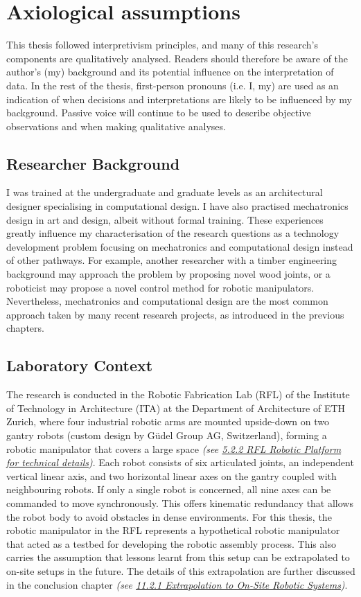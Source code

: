 \documentclass[11pt]{book}
\begin{document}
\section{Axiological assumptions}

This thesis followed interpretivism principles, and many of this research's components are qualitatively analysed. Readers should therefore be aware of the author’s (my) background and its potential influence on the interpretation of data. In the rest of the thesis, first-person pronouns (i.e. I, my) are used as an indication of when decisions and interpretations are likely to be influenced by my background. Passive voice will continue to be used to describe objective observations and when making qualitative analyses.

\subsection{Researcher Background}

I was trained at the undergraduate and graduate levels as an architectural designer specialising in computational design. I have also practised mechatronics design in art and design, albeit without formal training. These experiences greatly influence my characterisation of the research questions as a technology development problem focusing on mechatronics and computational design instead of other pathways. For example, another researcher with a timber engineering background may approach the problem by proposing novel wood joints, or a roboticist may propose a novel control method for robotic manipulators. Nevertheless, mechatronics and computational design are the most common approach taken by many recent research projects, as introduced in the previous chapters.

\subsection{Laboratory Context}

The research is conducted in the Robotic Fabrication Lab (RFL) of the Institute of Technology in Architecture (ITA) at the Department of Architecture of ETH Zurich, where four industrial robotic arms are mounted upside-down on two gantry robots (custom design by Güdel Group AG, Switzerland), forming a robotic manipulator that covers a large space\textit{ (see \underline{5.2.2 RFL Robotic Platform for technical details})}. Each robot consists of six articulated joints, an independent vertical linear axis, and two horizontal linear axes on the gantry coupled with neighbouring robots. If only a single robot is concerned, all nine axes can be commanded to move synchronously. This offers kinematic redundancy that allows the robot body to avoid obstacles in dense environments. For this thesis, the robotic manipulator in the RFL represents a hypothetical robotic manipulator that acted as a testbed for developing the robotic assembly process. This also carries the assumption that lessons learnt from this setup can be extrapolated to on-site setups in the future. The details of this extrapolation are further discussed in the conclusion chapter \textit{(see \underline{11.2.1 Extrapolation to On-Site Robotic Systems})}. 
\end{document}

